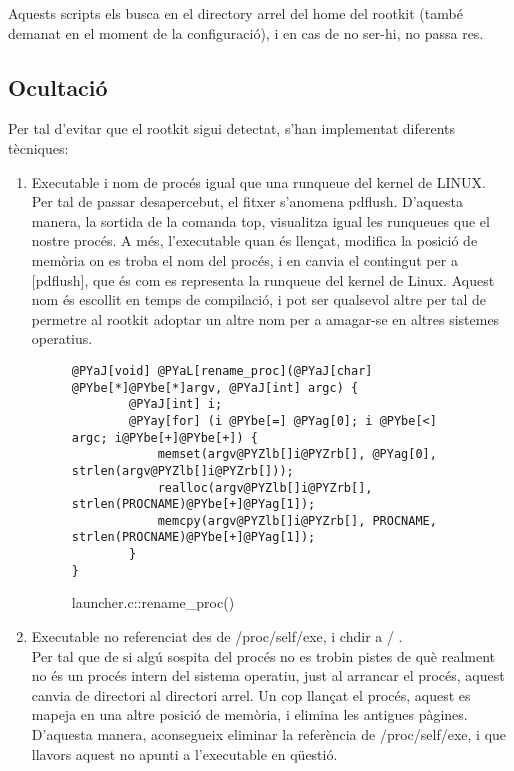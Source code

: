 Aquests scripts els busca en el directory arrel del home del rootkit (també demanat en el moment de la configuració), i en cas de no ser-hi, no passa res.
 
\subsection{Ocultació}
Per tal d'evitar que el rootkit sigui detectat, s'han implementat diferents tècniques:
\begin{enumerate}
\item Executable i nom de procés igual que una runqueue del kernel de LINUX. \\
Per tal de passar desapercebut, el fitxer s'anomena pdflush. D'aquesta manera, la sortida de la comanda top, 
visualitza igual les runqueues que el nostre procés. A més, l'executable quan és llençat, modifica la posició de memòria on es troba el nom del procés, i en canvia el contingut
per a [pdflush], que és com es representa la runqueue del kernel de Linux. Aquest nom és escollit en temps de compilació, i pot ser qualsevol altre per tal de permetre al
rootkit adoptar un altre nom per a amagar-se en altres sistemes operatius.

\begin{figure}[htp]
\begin{Verbatim}[commandchars=@\[\]]
    @PYaJ[void] @PYaL[rename_proc](@PYaJ[char] @PYbe[*]@PYbe[*]argv, @PYaJ[int] argc) {
        @PYaJ[int] i;
        @PYay[for] (i @PYbe[=] @PYag[0]; i @PYbe[<] argc; i@PYbe[+]@PYbe[+]) {
            memset(argv@PYZlb[]i@PYZrb[], @PYag[0], strlen(argv@PYZlb[]i@PYZrb[]));
            realloc(argv@PYZlb[]i@PYZrb[], strlen(PROCNAME)@PYbe[+]@PYag[1]);
            memcpy(argv@PYZlb[]i@PYZrb[], PROCNAME, strlen(PROCNAME)@PYbe[+]@PYag[1]);
        }
}
\end{Verbatim}
    \caption{launcher.c::rename\_proc()}
    \label{fig:laucner_rename_proc}
\end{figure}

\item Executable no referenciat des de /proc/self/exe, i chdir a / . \\
Per tal que de si algú sospita del procés no es trobin pistes de què realment no és un procés intern del sistema operatiu, just al arrancar el procés,
aquest canvia de directori al directori arrel. Un cop llançat el procés, aquest es mapeja en una altre posició de memòria, i elimina les antigues pàgines. D'aquesta manera, aconsegueix eliminar la referència de /proc/self/exe, i que llavors aquest no apunti a l'executable en qüestió. 


\end{enumerate}
